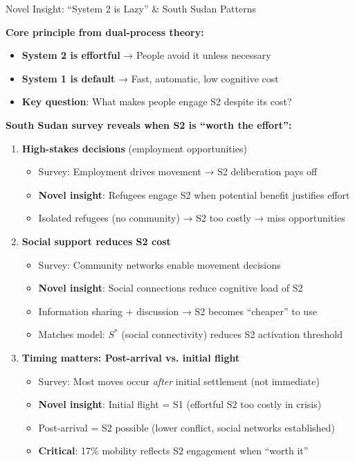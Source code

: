 \documentclass[aspectratio=169]{beamer}
\begin{document}
\begin{frame}{Novel Insight: ``System 2 is Lazy'' \& South Sudan Patterns}

\textbf{Core principle from dual-process theory:}
\begin{itemize}
    \item \textbf{System 2 is effortful} → People avoid it unless necessary
    \item \textbf{System 1 is default} → Fast, automatic, low cognitive cost
    \item \textbf{Key question}: What makes people engage S2 despite its cost?
\end{itemize}

\vspace{0.5em}

\textbf{South Sudan survey reveals when S2 is ``worth the effort'':}

\begin{enumerate}
    \item \textbf{High-stakes decisions} (employment opportunities)
    \begin{itemize}
        \item Survey: Employment drives movement → S2 deliberation pays off
        \item \textbf{Novel insight}: Refugees engage S2 when potential benefit justifies effort
        \item Isolated refugees (no community) → S2 too costly → miss opportunities
    \end{itemize}
    
    \item \textbf{Social support reduces S2 cost}
    \begin{itemize}
        \item Survey: Community networks enable movement decisions
        \item \textbf{Novel insight}: Social connections reduce cognitive load of S2
        \item Information sharing + discussion → S2 becomes ``cheaper'' to use
        \item Matches model: $S^*$ (social connectivity) reduces S2 activation threshold
    \end{itemize}
    
    \item \textbf{Timing matters: Post-arrival vs. initial flight}
    \begin{itemize}
        \item Survey: Most moves occur \textit{after} initial settlement (not immediate)
        \item \textbf{Novel insight}: Initial flight = S1 (effortful S2 too costly in crisis)
        \item Post-arrival = S2 possible (lower conflict, social networks established)
        \item \textbf{Critical}: 17\% mobility reflects S2 engagement when ``worth it''
    \end{itemize}
\end{enumerate}

\end{frame}
\end{document}
